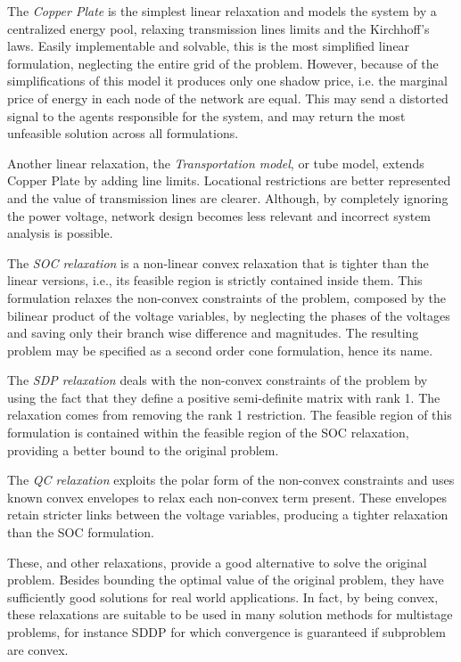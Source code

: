 \documentclass{juliacon}
\begin{document}
The \textit{Copper Plate} is the simplest linear relaxation and models the system by a centralized energy pool, relaxing transmission lines limits and the Kirchhoff’s laws. Easily implementable and solvable, this is the most simplified linear formulation, neglecting the entire grid of the problem. However, because of the simplifications of this model it produces only one shadow price, i.e. the marginal price of energy in each node of the network are equal. This may send a distorted signal to the agents responsible for the system, and may return the most unfeasible solution across all formulations.

Another linear relaxation, the \textit{Transportation model}, or tube model, extends Copper Plate by adding line limits. Locational restrictions are better represented and the value of transmission lines are clearer. Although, by completely ignoring the power voltage, network design becomes less relevant and incorrect system analysis is possible.

The \textit{SOC relaxation} is a non-linear convex relaxation that is tighter than the linear versions, i.e., its feasible region is strictly contained inside them. This formulation relaxes the non-convex constraints of the problem, composed by the bilinear product of the voltage variables, by neglecting the phases of the voltages and saving only their branch wise difference and magnitudes. The resulting problem may be specified as a second order cone formulation, hence its name.

The \textit{SDP relaxation} deals with the non-convex constraints of the problem by using the fact that they define a positive semi-definite matrix with rank 1. The relaxation comes from removing the rank 1 restriction. The feasible region of this formulation is contained within the feasible region of the SOC relaxation, providing a better bound to the original problem. 

The \textit{QC relaxation} exploits the polar form of the non-convex constraints and uses known convex envelopes to relax each non-convex term present. These envelopes retain stricter links between the voltage variables, producing a tighter relaxation than the SOC formulation.

These, and other relaxations, provide a good alternative to solve the original problem. Besides bounding the optimal value of the original problem, they have sufficiently good solutions for real world applications.
In fact, by being convex, these relaxations are suitable to be used in many solution methods for multistage problems, for instance SDDP for which convergence is guaranteed if subproblem are convex.
\end{document}
